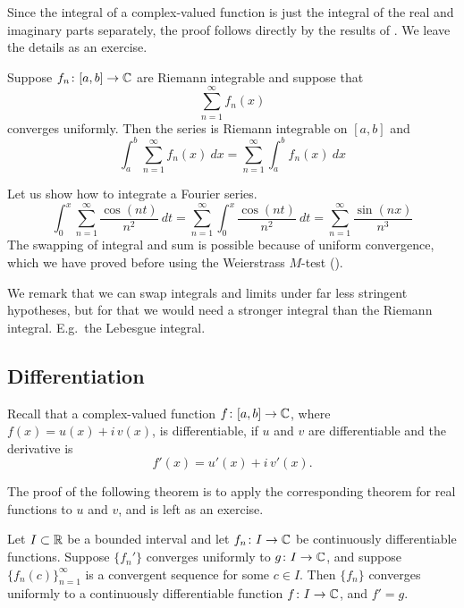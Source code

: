 Since the integral of a complex-valued function is just the integral of
the real and imaginary parts separately,
the proof follows directly by the results of
.
We leave the details as an exercise.

\begin{cor}
Suppose $f_n \colon [a,b] \to {\mathbb{C}}$
are Riemann integrable and suppose that
\begin{equation*}
\sum_{n=1}^\infty f_n(x)
\end{equation*}
converges uniformly.  Then the series is Riemann integrable on $[a,b]$
and
\begin{equation*}
\int_a^b \sum_{n=1}^\infty f_n(x) ~dx
=
\sum_{n=1}^\infty \int_a^b f_n(x) ~dx
\end{equation*}
\end{cor}

\begin{example}
Let us show how to integrate a Fourier series.
\begin{equation*}
\int_{0}^x \sum_{n=1}^\infty \frac{\cos(nt)}{n^2} ~dt
=
\sum_{n=1}^\infty \int_{0}^x \frac{\cos(nt)}{n^2}~dt
=
\sum_{n=1}^\infty \frac{\sin(nx)}{n^3}
\end{equation*}
The swapping of integral and sum is possible because of uniform convergence,
which we have proved before using the Weierstrass $M$-test
().
\end{example}

We remark that we can swap integrals and limits under far less stringent hypotheses,
but for that we would need a stronger integral than the Riemann integral.
E.g.\ the Lebesgue integral.

\subsection{Differentiation}

Recall that a complex-valued function
$f \colon [a,b] \to {\mathbb{C}}$, where $f(x) = u(x)+i\,v(x)$,
is differentiable, if $u$ and $v$ are differentiable
and the derivative is
\begin{equation*}
f'(x) = u'(x)+i\,v'(x) .
\end{equation*}

The proof of the following theorem is to apply the corresponding theorem for
real functions to $u$ and $v$, and is left as an exercise.

\begin{thm} \label{thm:dersconvergecomplex}
Let $I \subset {\mathbb{R}}$ be a bounded interval and let
$f_n \colon I \to {\mathbb{C}}$ be continuously differentiable functions.
Suppose $\{ f_n' \}$ converges uniformly to $g \colon I \to {\mathbb{C}}$,
and suppose $\{ f_n(c) \}_{n=1}^\infty$ is a
convergent sequence for some $c \in I$.  Then $\{ f_n \}$ converges uniformly to 
a continuously differentiable function $f \colon I \to {\mathbb{C}}$, and $f' = g$.
\end{thm}

